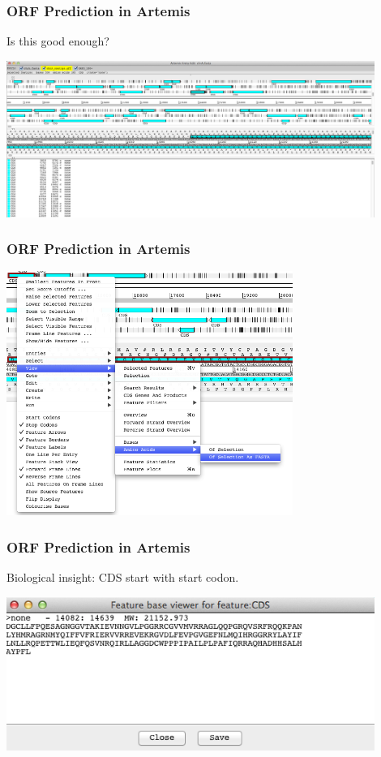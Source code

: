 \documentclass[table]{beamer}
\begin{document}
    \begin{frame}
      \frametitle{ORF Prediction in Artemis} 
      Is this good enough?
      \begin{center}
        \includegraphics[width=0.9\textwidth]{images/artemis_orf4}     
      \end{center}
    \end{frame}

    \begin{frame}
      \frametitle{ORF Prediction in Artemis}    
      \begin{center}
        \includegraphics[width=0.7\textwidth]{images/artemis_orf5}     
      \end{center}
    \end{frame}

    \begin{frame}
      \frametitle{ORF Prediction in Artemis}
      Biological insight: CDS start with start codon.
      \begin{center}
        \includegraphics[width=0.9\textwidth]{images/artemis_orf6}     
      \end{center}
    \end{frame}
\end{document}

